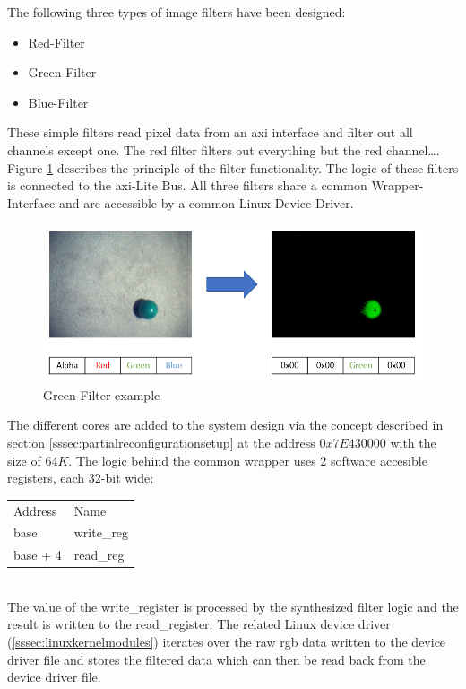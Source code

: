 The following three types of image filters have been designed:
\begin{itemize}
\item Red-Filter
\item Green-Filter
\item Blue-Filter
\end{itemize}
These simple filters read pixel data from an \gls{axi} interface and filter out
all channels except one.
The red filter filters out everything but the red channel\ldots.
Figure \ref{fig:imagefilter} describes the principle of the filter
functionality.
The logic of these filters is connected to the \gls{axi}-Lite Bus.
All three filters share a common Wrapper-Interface and are accessible by a
common Linux-Device-Driver.\\
\begin{figure}[htbp]
\centering
\includegraphics[width=1\textwidth]{sections/methodology/ImageFilter.PNG}
\caption{\label{fig:imagefilter} Green Filter example}
\end{figure}
The different cores are added to the system design via the concept described in
section \ref{sssec:partialreconfigurationsetup} at the address $0x7E430000$ with
the size of $64K$.
The logic behind the common wrapper uses 2 software accesible registers, each
32-bit wide:\\
\begin{tabular}{ll}
	Address & Name \\
	base     & write\_reg\\
	base + 4 & read\_reg\\
\end{tabular}\\
The value of the write\_register is processed by the synthesized filter logic
and the result is written to the read\_register.
The related Linux device driver (\ref{sssec:linuxkernelmodules}) iterates over
the raw \gls{rgb} data written to the device driver file and stores the filtered
data which can then be read back from the device driver file.
